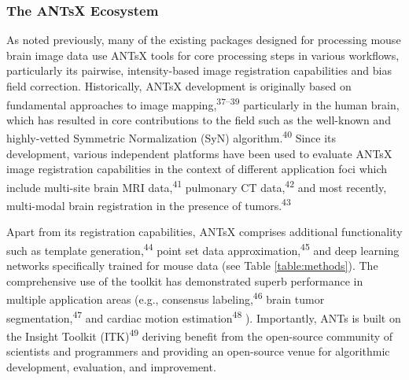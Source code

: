 \documentclass[
  12pt,
]{article}
\begin{document}
\hypertarget{the-antsx-ecosystem}{%
\subsubsection*{The ANTsX Ecosystem}\label{the-antsx-ecosystem}}

As noted previously, many of the existing packages designed for
processing mouse brain image data use ANTsX tools for core processing
steps in various workflows, particularly its pairwise, intensity-based
image registration capabilities and bias field correction. Historically,
ANTsX development is originally based on fundamental approaches to image
mapping,\textsuperscript{37--39} particularly in the human brain, which
has resulted in core contributions to the field such as the well-known
and highly-vetted Symmetric Normalization (SyN)
algorithm.\textsuperscript{40} Since its development, various
independent platforms have been used to evaluate ANTsX image
registration capabilities in the context of different application foci
which include multi-site brain MRI data,\textsuperscript{41} pulmonary
CT data,\textsuperscript{42} and most recently, multi-modal brain
registration in the presence of tumors.\textsuperscript{43}



Apart from its registration capabilities, ANTsX comprises additional
functionality such as template generation,\textsuperscript{44} point set
data approximation,\textsuperscript{45} and deep learning networks
specifically trained for mouse data (see Table \ref{table:methods}). The
comprehensive use of the toolkit has demonstrated superb performance in
multiple application areas (e.g., consensus
labeling,\textsuperscript{46} brain tumor
segmentation,\textsuperscript{47} and cardiac motion
estimation\textsuperscript{48} ). Importantly, ANTs is built on the
Insight Toolkit (ITK)\textsuperscript{49} deriving benefit from the
open-source community of scientists and programmers and providing an
open-source venue for algorithmic development, evaluation, and
improvement.
\end{document}
